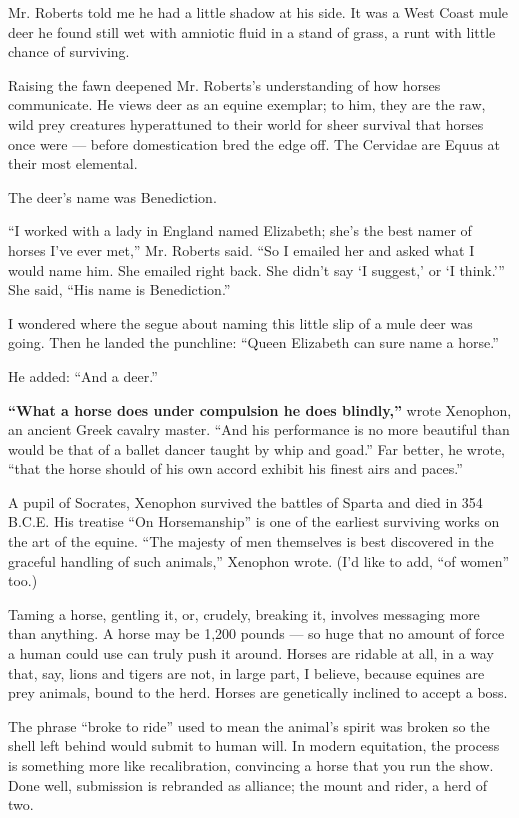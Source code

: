 Mr. Roberts told me he had a little shadow at his side. It was a West
Coast mule deer he found still wet with amniotic fluid in a stand of
grass, a runt with little chance of surviving.

Raising the fawn deepened Mr. Roberts's understanding of how horses
communicate. He views deer as an equine exemplar; to him, they are the
raw, wild prey creatures hyperattuned to their world for sheer survival
that horses once were --- before domestication bred the edge off. The
Cervidae are Equus at their most elemental.

The deer's name was Benediction.

``I worked with a lady in England named Elizabeth; she's the best namer
of horses I've ever met,'' Mr. Roberts said. ``So I emailed her and
asked what I would name him. She emailed right back. She didn't say `I
suggest,' or `I think.''' She said, ``His name is Benediction.''

I wondered where the segue about naming this little slip of a mule deer
was going. Then he landed the punchline: ``Queen Elizabeth can sure name
a horse.''

He added: ``And a deer.''

\textbf{``What a horse does under compulsion he does blindly,''} wrote
Xenophon, an ancient Greek cavalry master. ``And his performance is no
more beautiful than would be that of a ballet dancer taught by whip and
goad.'' Far better, he wrote, ``that the horse should of his own accord
exhibit his finest airs and paces.''

A pupil of Socrates, Xenophon survived the battles of Sparta and died in
354 B.C.E. His treatise ``On Horsemanship'' is one of the earliest
surviving works on the art of the equine. ``The majesty of men
themselves is best discovered in the graceful handling of such
animals,'' Xenophon wrote. (I'd like to add, ``of women'' too.)

Taming a horse, gentling it, or, crudely, breaking it, involves
messaging more than anything. A horse may be 1,200 pounds --- so huge
that no amount of force a human could use can truly push it around.
Horses are ridable at all, in a way that, say, lions and tigers are not,
in large part, I believe, because equines are prey animals, bound to the
herd. Horses are genetically inclined to accept a boss.

The phrase ``broke to ride'' used to mean the animal's spirit was broken
so the shell left behind would submit to human will. In modern
equitation, the process is something more like recalibration, convincing
a horse that you run the show. Done well, submission is rebranded as
alliance; the mount and rider, a herd of two.

